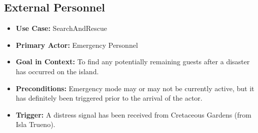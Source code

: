 \documentclass[12pt]{article}
\begin{document}
\subsection{External Personnel}
    \begin{itemize}
        \item[]\textbf{Use Case:}                                
            SearchAndRescue

        \item[]\textbf{Primary Actor:}
            Emergency Personnel

        \item[]\textbf{Goal in Context:}
            To find any potentially remaining guests after a disaster has occurred on the island.
            
        \item[]\textbf{Preconditions:}
            Emergency mode may or may not be currently active, but it has definitely been triggered prior to 
            the arrival of the actor.

        \item[]\textbf{Trigger:}
            A distress signal has been received from Cretaceous Gardens (from Isla Trueno).


\end{itemize}
\end{document}
